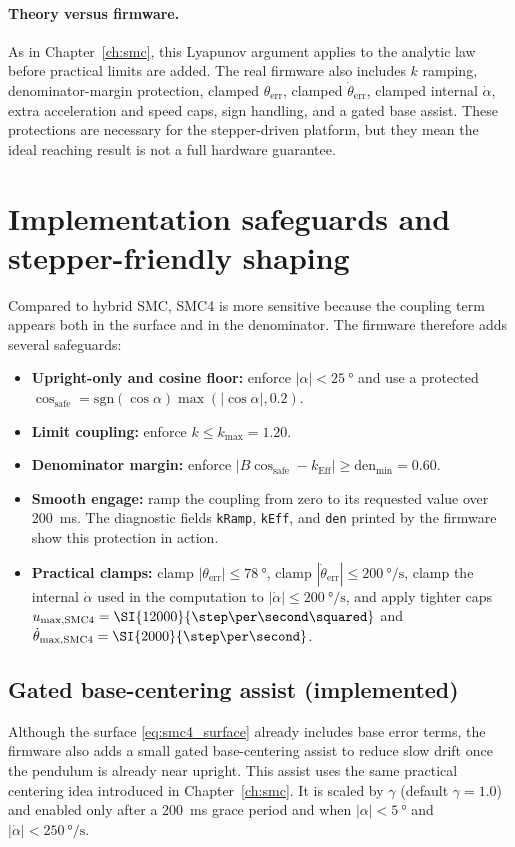 \paragraph{Theory versus firmware.}
As in Chapter~\ref{ch:smc}, this Lyapunov argument applies to the analytic law before practical limits are added. The real firmware also includes $k$ ramping, denominator-margin protection, clamped $\theta_{\mathrm{err}}$, clamped $\dot{\theta}_{\mathrm{err}}$, clamped internal $\dot{\alpha}$, extra acceleration and speed caps, sign handling, and a gated base assist. These protections are necessary for the stepper-driven platform, but they mean the ideal reaching result is not a full hardware guarantee.

\section{Implementation safeguards and stepper-friendly shaping}
\label{sec:smc4_safeguards}
Compared to hybrid SMC, SMC4 is more sensitive because the coupling term appears both in the surface and in the denominator. The firmware therefore adds several safeguards:
\begin{itemize}
  \item \textbf{Upright-only and cosine floor:} enforce $|\alpha|<\SI{25}{\degree}$ and use a protected $\cos_{\mathrm{safe}}=\mathrm{sgn}(\cos\alpha)\max(|\cos\alpha|,0.2)$.
  \item \textbf{Limit coupling:} enforce $k\le k_{\max}=1.20$.
  \item \textbf{Denominator margin:} enforce $|B\cos_{\mathrm{safe}}-k_{\mathrm{Eff}}|\ge \mathrm{den}_{\min}=0.60$.
  \item \textbf{Smooth engage:} ramp the coupling from zero to its requested value over \SI{200}{ms}. The diagnostic fields \texttt{kRamp}, \texttt{kEff}, and \texttt{den} printed by the firmware show this protection in action.
  \item \textbf{Practical clamps:} clamp $|\theta_{\mathrm{err}}|\le \SI{78}{\degree}$, clamp $|\dot{\theta}_{\mathrm{err}}|\le \SI{200}{\degree\per\second}$, clamp the internal $\dot{\alpha}$ used in the computation to $|\dot{\alpha}|\le \SI{200}{\degree\per\second}$, and apply tighter caps $u_{\max,\mathrm{SMC4}}=\SI{12000}{\step\per\second\squared}$ and $\dot{\theta}_{\max,\mathrm{SMC4}}=\SI{2000}{\step\per\second}$.
\end{itemize}

\subsection{Gated base-centering assist (implemented)}
Although the surface \eqref{eq:smc4_surface} already includes base error terms, the firmware also adds a small gated base-centering assist to reduce slow drift once the pendulum is already near upright. This assist uses the same practical centering idea introduced in Chapter~\ref{ch:smc}. It is scaled by $\gamma$ (default $\gamma=1.0$) and enabled only after a \SI{200}{ms} grace period and when $|\alpha|<\SI{5}{\degree}$ and $|\dot{\alpha}|<\SI{250}{\degree\per\second}$.

